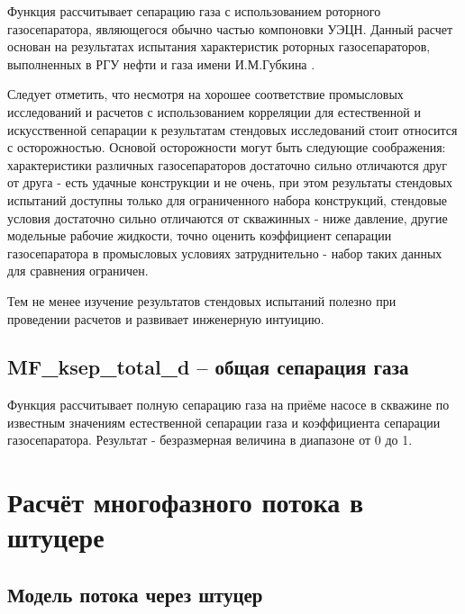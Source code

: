 Функция рассчитывает сепарацию газа с использованием роторного газосепаратора, являющегося обычно частью компоновки УЭЦН. Данный расчет основан на результатах испытания характеристик роторных газосепараторов, выполненных в РГУ нефти и газа имени И.М.Губкина \cite{SPE_117415_2008}. 

Следует отметить, что несмотря на хорошее соответствие промысловых исследований и расчетов с использованием корреляции для естественной и искусственной сепарации \cite{SPE_117415_2008} к результатам стендовых исследований стоит относится с осторожностью. Основой осторожности могут быть следующие соображения: характеристики различных газосепараторов достаточно сильно отличаются друг от друга - есть удачные конструкции и не очень, при этом результаты стендовых испытаний доступны только для ограниченного набора конструкций, стендовые условия достаточно сильно отличаются от скважинных - ниже давление, другие модельные рабочие жидкости, точно оценить коэффициент сепарации газосепаратора в промысловых условиях затруднительно - набор таких данных для сравнения ограничен. 

Тем не менее изучение результатов стендовых испытаний полезно при проведении расчетов и развивает инженерную интуицию. 



\subsection{MF\_ksep\_total\_d – общая сепарация газа}

Функция рассчитывает полную сепарацию газа на приёме насосе в скважине по известным значениям естественной сепарации газа и коэффициента сепарации газосепаратора. Результат - безразмерная величина в диапазоне от 0 до 1. 


\section{Расчёт многофазного потока в штуцере}




\subsection{Модель потока через штуцер}


